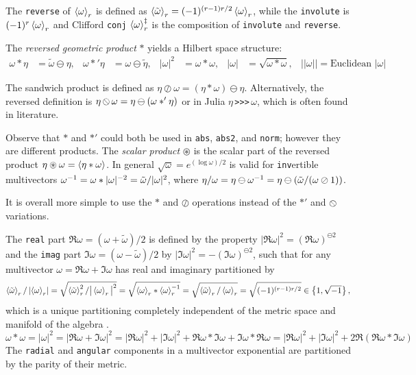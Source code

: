 \documentclass[]{article}
\DeclareMathOperator*{\obackslash}{\text{\reflectbox{$\oslash$}}}
\begin{document}
\begin{definition}
	The \verb`reverse` of $\left\langle \omega \right\rangle_r$ is defined as $\left\langle \tilde\omega \right\rangle_r = (-1)^{(r-1)r/2}\left\langle \omega \right\rangle_r$, while the \verb`involute` is $(-1)^r\left\langle \omega \right\rangle_r$ and Clifford \verb`conj`  $\left\langle \omega \right\rangle_r^\ddagger$ is the composition of \verb`involute` and \verb`reverse`.
\end{definition}

\begin{definition}
	The \textit{reversed geometric product} $\ast$ yields a Hilbert space structure:
	\begin{align*}
		\omega\ast\eta &= \tilde\omega\ominus\eta, & \omega\ast'\eta &= \omega\ominus\tilde\eta, & |\omega|^2 &= \omega\ast\omega, & |\omega| &= \sqrt{\omega\ast\omega}, & ||\omega|| = \text{Euclidean }|\omega|
	\end{align*}
\end{definition}
\begin{definition}
	The sandwich product is defined as $\eta\oslash\omega = (\eta\ast\omega)\ominus\eta$. Alternatively, the reversed definition is $\eta\obackslash\omega = \eta\ominus(\omega\ast'\eta)$ or in Julia $\eta\,$\verb`>>>`$\,\omega$, which is often found in literature.
\end{definition}
\begin{note}
	Observe that $\ast$ and $\ast'$ could both be used in \verb`abs`, \verb`abs2`, and \verb`norm`; however they are different products.
	The \textit{scalar product} $\circledast$ is the scalar part of the reversed product $\eta\circledast\omega = \left\langle \eta\ast\omega \right\rangle$.
	In general $\sqrt\omega = e^{(\log\omega)/2}$ is valid for \verb`inv`ertible multivectors $\omega^{-1} = \omega\ast|\omega|^{-2} = \tilde\omega/|\omega|^2$, where $\eta/\omega = \eta\ominus\omega^{-1} = \eta\ominus(\tilde\omega/(\omega\oslash1))$.
\end{note}
\begin{remark}
	It is overall more simple to use the $\ast$ and $\oslash$ operations instead of the $\ast'$ and $\obackslash$ variations.
\end{remark}
The \verb`real` part $\Re\omega = (\omega+\tilde\omega)/2$ is defined by the property $|\Re\omega|^2 = (\Re\omega)^{\ominus2}$ and the \verb`imag` part $\Im\omega = (\omega-\tilde\omega)/2$ by $|\Im\omega|^2 = -(\Im\omega)^{\ominus2}$, such that for any multivector $\omega = \Re\omega+\Im\omega$ has real and imaginary partitioned by 
$$\left\langle \tilde\omega \right\rangle_r/\left|\left\langle \omega \right\rangle_r\right| = \sqrt{\left\langle \tilde\omega \right\rangle_r^2/\big|\left\langle \omega \right\rangle_r\big|^2} = \sqrt{\left\langle \omega \right\rangle_r\ast\left\langle \omega \right\rangle_r^{-1}} = \sqrt{\left\langle \tilde\omega \right\rangle_r/\left\langle \omega \right\rangle_r}=\sqrt{(-1)^{(r-1)r/2}} \in\left\{ 1,\sqrt{-1} \right\},$$
which is a unique partitioning completely independent of the metric space and manifold of the algebra \cite{chappell-iqbal-gunn-abbott}.
$$ \omega\ast\omega = |\omega|^2 = |\Re\omega+\Im\omega|^2 = |\Re\omega|^2 + |\Im\omega|^2 + \Re\omega\ast\Im\omega + \Im\omega\ast\Re\omega = |\Re\omega|^2+|\Im\omega|^2 + 2\Re(\Re\omega\ast\Im\omega) $$
The \verb`radial` and \verb`angular` components in a multivector exponential are partitioned by the parity of their metric.
\end{document}
